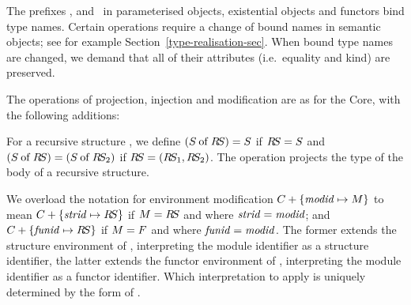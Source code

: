 
The prefixes , \exmod{\T,\_} and \fun{\T}{\_}{\_}\ 
in parameterised objects, existential objects and
functors bind type names.
Certain operations require a change of bound names in semantic objects;
 see for example Section~\ref{type-realisation-sec}.
When bound type names are changed, we demand that all of their attributes (i.e.\ equality and kind) are preserved.

The operations of projection, injection and modification are as for the Core, with the following additions:

For a recursive structure \RS, we define $(S \mathbin{\rm of} R\!S)=S$ if $R\!S = S$ and $(S \mathbin{\rm of} R\!S)=(S \mathbin{\rm of} R\!S_2)$ if $R\!S = ({R\!S_{1}},{R\!S_{2}})$.
The operation projects the type of the body of a recursive structure.

We overload the notation for environment modification $C+\{{\it modid}\mapsto M\}$ to mean
$C+\{{\it strid}\mapsto R\!S\}$ if $M = R\!S$ and where ${\it strid}={\it modid}$;
and $C+\{{\it funid}\mapsto R\!S\}$ if $M = F$ and where ${\it funid}={\it modid}$. The former extends the structure environment of \C, interpreting the module identifier as a structure identifier, the latter extends 
the functor environment of \C, interpreting the module
identifier as a functor identifier. Which interpretation to apply is uniquely determined by the form of \M.





